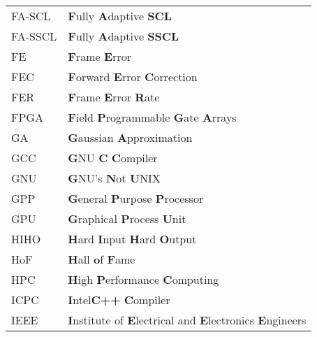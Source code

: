 \begin{center}
\begin{longtable}{ p{}  p{} }
FA-SCL      & \textbf{F}ully \textbf{A}daptive \textbf{SCL}                                                                   \\
FA-SSCL     & \textbf{F}ully \textbf{A}daptive \textbf{SSCL}                                                                  \\
FE          & \textbf{F}rame \textbf{E}rror                                                                                   \\
FEC         & \textbf{F}orward \textbf{E}rror \textbf{C}orrection                                                             \\
FER         & \textbf{F}rame \textbf{E}rror \textbf{R}ate                                                                     \\
FPGA        & \textbf{F}ield \textbf{P}rogrammable \textbf{G}ate \textbf{A}rrays                                              \\
GA          & \textbf{G}aussian \textbf{A}pproximation                                                                        \\
GCC         & \textbf{G}NU \textbf{C} \textbf{C}ompiler                                                                       \\
GNU         & \textbf{G}NU’s \textbf{N}ot \textbf{U}NIX                                                                       \\
GPP         & \textbf{G}eneral \textbf{P}urpose \textbf{P}rocessor                                                            \\
GPU         & \textbf{G}raphical \textbf{P}rocess \textbf{U}nit                                                               \\
HIHO        & \textbf{H}ard \textbf{I}nput \textbf{H}ard \textbf{O}utput                                                      \\
HoF         & \textbf{H}all \textbf{o}f \textbf{F}ame                                                                         \\
HPC         & \textbf{H}igh \textbf{P}erformance \textbf{C}omputing                                                           \\
ICPC        & \textbf{I}ntel\R \textbf{C++} \textbf{C}ompiler                                                                 \\
IEEE        & \textbf{I}nstitute of \textbf{E}lectrical and \textbf{E}lectronics \textbf{E}ngineers                           \\

\end{longtable}
\end{center}
